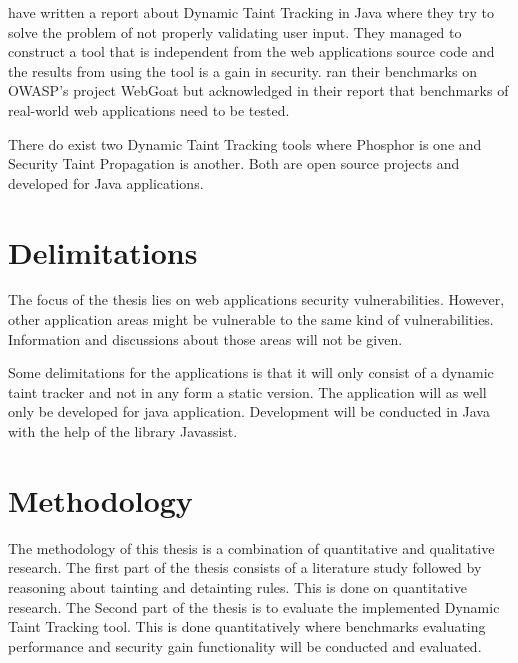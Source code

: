 \textcite{Haldar} have written a report about Dynamic Taint Tracking in Java where they try to solve the problem of not properly validating user input. They managed to construct a tool that is independent from the web applications source code and the results from using the tool is a gain in security. \textcite{Haldar} ran their benchmarks on OWASP’s project WebGoat \parencite{webgoat} but acknowledged in their report that benchmarks of real-world web applications need to be tested.

There do exist two Dynamic Taint Tracking tools where Phosphor \parencite{phosphor} is one and Security Taint Propagation \parencite{securityTaint} is another. Both are open source projects and developed for Java applications.


\section{Delimitations}
\label{Delimitations}
The focus of the thesis lies on web applications security vulnerabilities. However, other application areas might be vulnerable to the same kind of vulnerabilities. Information and discussions about those areas will not be given.

Some delimitations for the applications is that it will only consist of a dynamic taint tracker and not in any form a static version. The application will as well only be developed for java application. Development will be conducted in Java with the help of the library Javassist.


\section{Methodology}
\label{Methodology}
The methodology of this thesis is a combination of quantitative and qualitative research. The first part of the thesis consists of a literature study followed by reasoning about tainting and detainting rules. This is done on quantitative research. The Second part of the thesis is to evaluate the implemented Dynamic Taint Tracking tool. This is done quantitatively where benchmarks evaluating performance and security gain functionality will be conducted and evaluated.
